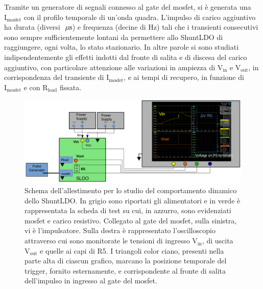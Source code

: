 Tramite un generatore di segnali connesso al gate del mosfet, si \`e generata una $\mathrm{I_{mosfet}}$ con il profilo temporale di un'onda quadra. L'impulso di carico aggiuntivo ha durata (diversi $\; \mu \rm s$) e frequenza (decine di Hz) tali che i transienti consecutivi sono sempre sufficientemente lontani da permettere allo ShuntLDO di raggiungere, ogni volta, lo stato stazionario. In altre parole si sono studiati indipendentemente gli effetti indotti dal fronte di salita e di discesa del carico aggiuntivo, con particolare attenzione alle variazioni in ampiezza di $\mathrm{V_{in}}$ e $\mathrm{V_{out}}$, in corrispondenza del transiente di $\mathrm{I_{mosfet}}$, e ai tempi di recupero, in funzione di $\mathrm{I_{mosfet}}$ e con $\mathrm{R_{load}}$ fissata.
\begin{figure}[!htb]
\centering
\includegraphics[width=.99\linewidth]{Immagini/SetupScheme}
\caption{Schema dell'allestimento per lo studio del comportamento dinamico dello ShuntLDO. In grigio sono riportati gli alimentatori e in verde è rappresentata la scheda di test su cui, in azzurro, sono evidenziati mosfet e carico resistivo. Collegato al gate del mosfet, sulla sinistra, vi è l'impulsatore. Sulla destra è rappresentato l'oscilloscopio attraverso cui sono monitorate le tensioni di ingresso $\mathrm{V_{in}}$, di uscita $\mathrm{V_{out}}$ e quelle ai capi di R5. I triangoli color ciano, presenti nella parte alta di ciascun grafico, marcano la posizione temporale del trigger, fornito esternamente, e corrispondente al fronte di salita dell'impulso in ingresso al gate del mosfet.}
\label{Setupscheme}
\end{figure}

